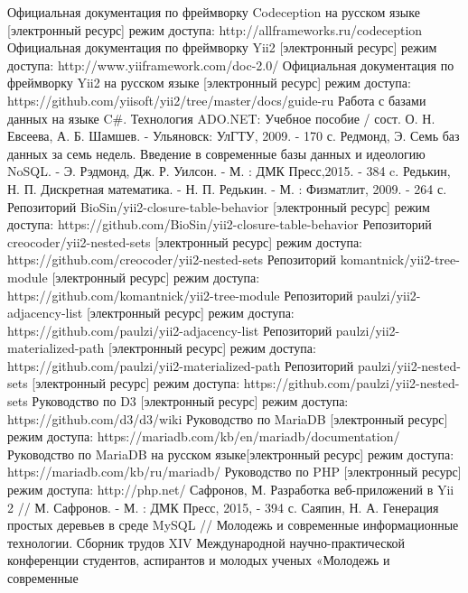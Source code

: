 \documentclass[a4paper,14pt]{extreport}
\theoremstyle{definition}
\begin{document}
\begin{thebibliography}{99}
 Официальная документация по фреймворку Codeception на русском языке  [электронный ресурс] режим доступа:  http://allframeworks.ru/codeception
 Официальная документация по фреймворку Yii2  [электронный ресурс] режим доступа: http://www.yiiframework.com/doc-2.0/
 Официальная документация по фреймворку Yii2 на русском языке  [электронный ресурс] режим доступа: https://github.com/yiisoft/yii2/tree/master/docs/guide-ru
 Работа с базами данных на языке C\#. Технология ADO.NET: Учебное пособие / сост. О. Н. Евсеева, А. Б. Шамшев. - Ульяновск: УлГТУ, 2009. - 170 с.
 Редмонд, Э. Семь баз данных за семь недель. Введение в современные базы данных и идеологию NoSQL. - Э. Рэдмонд, Дж. Р. Уилсон. - М. : ДМК Пресс,2015. - 384 c.
 Редькин, Н. П. Дискретная математика. - Н. П. Редькин. - М. : Физматлит, 2009. - 264 с.
 Репозиторий BioSin/yii2-closure-table-behavior [электронный ресурс] режим доступа: https://github.com/BioSin/yii2-closure-table-behavior
 Репозиторий creocoder/yii2-nested-sets [электронный ресурс] режим доступа: https://github.com/creocoder/yii2-nested-sets
 Репозиторий komantnick/yii2-tree-module [электронный ресурс] режим доступа: https://github.com/komantnick/yii2-tree-module
 Репозиторий paulzi/yii2-adjacency-list [электронный ресурс] режим доступа: https://github.com/paulzi/yii2-adjacency-list
 Репозиторий paulzi/yii2-materialized-path [электронный ресурс] режим доступа: https://github.com/paulzi/yii2-materialized-path
 Репозиторий paulzi/yii2-nested-sets [электронный ресурс] режим доступа: https://github.com/paulzi/yii2-nested-sets
 Руководство по D3 [электронный ресурс] режим доступа: https://github.com/d3/d3/wiki
 Руководство по MariaDB [электронный ресурс] режим доступа: https://mariadb.com/kb/en/mariadb/documentation/
 Руководство по MariaDB на русском языке[электронный ресурс] режим доступа: https://mariadb.com/kb/ru/mariadb/
 Руководство по PHP [электронный ресурс] режим доступа: http://php.net/
 Сафронов, М. Разработка веб-приложений в Yii 2 // М. Сафронов. - М. : ДМК Пресс, 2015, - 394 с.
 Саяпин, Н. А. Генерация простых деревьев в среде MySQL // Молодежь и современные информационные технологии. Сборник трудов XIV Международной
научно-практической конференции студентов, аспирантов и молодых ученых «Молодежь и современные

\end{thebibliography}
\end{document}
